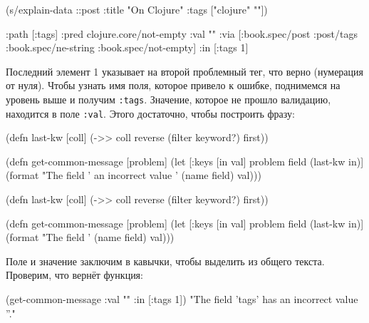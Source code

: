 \else

\begin{english}
  \begin{clojure}
(s/explain-data ::post {:title "On Clojure"
                        :tags ["clojure" ""]})

{:path [:tags]
 :pred clojure.core/not-empty
 :val ""
 :via [:book.spec/post
       :post/tags
       :book.spec/ne-string
       :book.spec/not-empty]
 :in [:tags 1]}
  \end{clojure}
\end{english}

\fi

Последний элемент 1 указывает на второй проблемный тег, что верно (нумерация от
нуля). Чтобы узнать имя поля, которое привело к ошибке, поднимемся на уровень
выше и получим \verb|:tags|. Значение, которое не прошло валидацию, находится в
поле \verb|:val|. Этого достаточно, чтобы построить фразу:

\ifx\DEVICETYPE\MOBILE

\begin{english}
  \begin{clojure}
(defn last-kw [coll]
  (->> coll
       reverse
       (filter keyword?)
       first))

(defn get-common-message
  [problem]
  (let [{:keys [in val]} problem
        field (last-kw in)]
    (format
      "The field '%
                an incorrect value '%
      (name field) val)))
  \end{clojure}
\end{english}

\else

\begin{english}
  \begin{clojure}
(defn last-kw [coll]
  (->> coll
       reverse
       (filter keyword?)
       first))

(defn get-common-message
  [problem]
  (let [{:keys [in val]} problem
        field (last-kw in)]
    (format "The field '%
            (name field) val)))
  \end{clojure}
\end{english}

\fi

Поле и значение заключим в кавычки, чтобы выделить из общего текста. Проверим,
что вернёт функция:

\ifx\DEVICETYPE\MOBILE

\begin{english}
  \begin{clojure}
(get-common-message
  {:val "" :in [:tags 1]})
"The field 'tags' has
          an incorrect value ''."
  \end{clojure}
\end{english}

